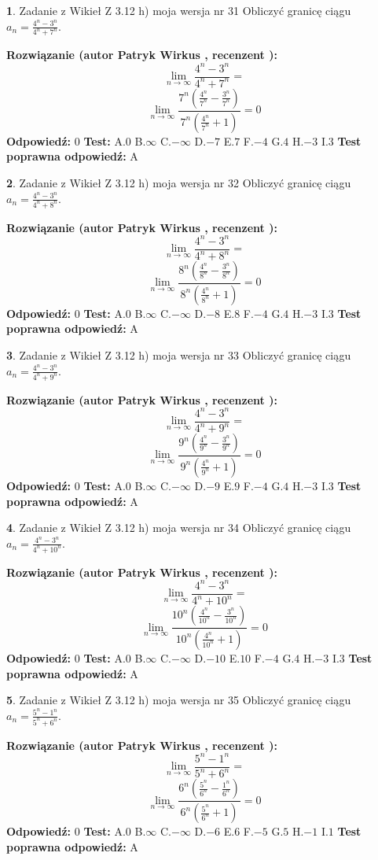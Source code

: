 \documentclass[12pt, a4paper]{article}
\theoremstyle{definition} %
\newtheorem{zad}{}
\newcommand{\zadStart}[1]{\begin{zad}#1\newline}
\newcommand{\zadStop}{\end{zad}}
\newcommand{\rozwStart}[2]{\noindent \textbf{Rozwiązanie (autor #1 , recenzent #2): }\newline}
\newcommand{\rozwStop}{\newline}
\newcommand{\odpStart}{\noindent \textbf{Odpowiedź:}\newline}
\newcommand{\odpStop}{\newline}
\newcommand{\testStart}{\noindent \textbf{Test:}\newline}
\newcommand{\testStop}{\newline}
\newcommand{\kluczStart}{\noindent \textbf{Test poprawna odpowiedź:}\newline}
\newcommand{\kluczStop}{\newline}
\begin{document}
\zadStart{Zadanie z Wikieł Z 3.12 h) moja wersja nr 31}
Obliczyć granicę ciągu $a_{n}=\frac{4^{n} - 3^{n}}{4^{n} + 7^{n}}$.
\zadStop
\rozwStart{Patryk Wirkus}{}
$$\lim\limits_{n\to\infty}\frac{4^{n} - 3^{n}}{4^{n} + 7^{n}}=$$
$$\lim\limits_{n\to\infty}\frac{7^{n}(\frac{4^{n}}{7^{n}} - \frac{3^{n}}{7^{n}})}{7^{n}(\frac{4^{n}}{7^{n}} + 1)} = 0$$
\rozwStop
\odpStart
$0$
\odpStop
\testStart
A.$0$
B.$\infty$
C.$-\infty$
D.$-7$
E.$7$
F.$-4$
G.$4$
H.$-3$
I.$3$
\testStop
\kluczStart
A
\kluczStop



\zadStart{Zadanie z Wikieł Z 3.12 h) moja wersja nr 32}
Obliczyć granicę ciągu $a_{n}=\frac{4^{n} - 3^{n}}{4^{n} + 8^{n}}$.
\zadStop
\rozwStart{Patryk Wirkus}{}
$$\lim\limits_{n\to\infty}\frac{4^{n} - 3^{n}}{4^{n} + 8^{n}}=$$
$$\lim\limits_{n\to\infty}\frac{8^{n}(\frac{4^{n}}{8^{n}} - \frac{3^{n}}{8^{n}})}{8^{n}(\frac{4^{n}}{8^{n}} + 1)} = 0$$
\rozwStop
\odpStart
$0$
\odpStop
\testStart
A.$0$
B.$\infty$
C.$-\infty$
D.$-8$
E.$8$
F.$-4$
G.$4$
H.$-3$
I.$3$
\testStop
\kluczStart
A
\kluczStop



\zadStart{Zadanie z Wikieł Z 3.12 h) moja wersja nr 33}
Obliczyć granicę ciągu $a_{n}=\frac{4^{n} - 3^{n}}{4^{n} + 9^{n}}$.
\zadStop
\rozwStart{Patryk Wirkus}{}
$$\lim\limits_{n\to\infty}\frac{4^{n} - 3^{n}}{4^{n} + 9^{n}}=$$
$$\lim\limits_{n\to\infty}\frac{9^{n}(\frac{4^{n}}{9^{n}} - \frac{3^{n}}{9^{n}})}{9^{n}(\frac{4^{n}}{9^{n}} + 1)} = 0$$
\rozwStop
\odpStart
$0$
\odpStop
\testStart
A.$0$
B.$\infty$
C.$-\infty$
D.$-9$
E.$9$
F.$-4$
G.$4$
H.$-3$
I.$3$
\testStop
\kluczStart
A
\kluczStop



\zadStart{Zadanie z Wikieł Z 3.12 h) moja wersja nr 34}
Obliczyć granicę ciągu $a_{n}=\frac{4^{n} - 3^{n}}{4^{n} + 10^{n}}$.
\zadStop
\rozwStart{Patryk Wirkus}{}
$$\lim\limits_{n\to\infty}\frac{4^{n} - 3^{n}}{4^{n} + 10^{n}}=$$
$$\lim\limits_{n\to\infty}\frac{10^{n}(\frac{4^{n}}{10^{n}} - \frac{3^{n}}{10^{n}})}{10^{n}(\frac{4^{n}}{10^{n}} + 1)} = 0$$
\rozwStop
\odpStart
$0$
\odpStop
\testStart
A.$0$
B.$\infty$
C.$-\infty$
D.$-10$
E.$10$
F.$-4$
G.$4$
H.$-3$
I.$3$
\testStop
\kluczStart
A
\kluczStop



\zadStart{Zadanie z Wikieł Z 3.12 h) moja wersja nr 35}
Obliczyć granicę ciągu $a_{n}=\frac{5^{n} - 1^{n}}{5^{n} + 6^{n}}$.
\zadStop
\rozwStart{Patryk Wirkus}{}
$$\lim\limits_{n\to\infty}\frac{5^{n} - 1^{n}}{5^{n} + 6^{n}}=$$
$$\lim\limits_{n\to\infty}\frac{6^{n}(\frac{5^{n}}{6^{n}} - \frac{1^{n}}{6^{n}})}{6^{n}(\frac{5^{n}}{6^{n}} + 1)} = 0$$
\rozwStop
\odpStart
$0$
\odpStop
\testStart
A.$0$
B.$\infty$
C.$-\infty$
D.$-6$
E.$6$
F.$-5$
G.$5$
H.$-1$
I.$1$
\testStop
\kluczStart
A
\kluczStop
\end{document}
